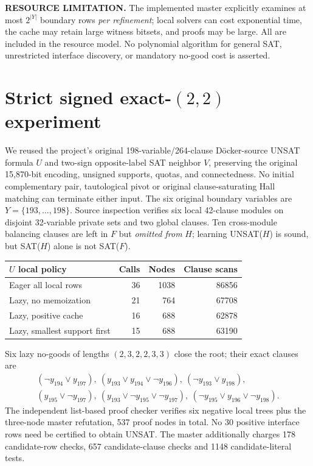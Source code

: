 \documentclass[11pt]{article}
\begin{document}
\noindent\textbf{RESOURCE LIMITATION.} The implemented master explicitly examines at most $2^{|Y|}$ boundary rows \emph{per refinement}; local solvers can cost exponential time, the cache may retain large witness bitsets, and proofs may be large. All are included in the resource model. No polynomial algorithm for general SAT, unrestricted interface discovery, or mandatory no-good cost is asserted.

\section{Strict signed exact-$(2,2)$ experiment}
We reused the project's original 198-variable/264-clause Döcker-source UNSAT formula $U$ and two-sign opposite-label SAT neighbor $V$, preserving the original 15,870-bit encoding, unsigned supports, quotas, and connectedness. No initial complementary pair, tautological pivot or original clause-saturating Hall matching can terminate either input. The six original boundary variables are $Y=\{193,\ldots,198\}$. Source inspection verifies six local 42-clause modules on disjoint 32-variable private sets and two global clauses. Ten cross-module balancing clauses are left in $F$ but \emph{omitted from} $H$; learning UNSAT($H$) is sound, but SAT($H$) alone is not SAT($F$).

\begin{center}
\begin{tabular}{lrrr}\toprule
$U$ local policy&Calls&Nodes&Clause scans\\\midrule
Eager all local rows&36&1038&86856\\
Lazy, no memoization&21&764&67708\\
Lazy, positive cache&16&688&62878\\
Lazy, smallest support first&15&688&63190\\\bottomrule
\end{tabular}
\end{center}
Six lazy no-goods of lengths $(2,3,2,2,3,3)$ close the root; their exact clauses are
\[
\begin{gathered}
(\neg y_{194}\lor y_{197}),~
(y_{193}\lor y_{194}\lor\neg y_{196}),~
(\neg y_{193}\lor y_{198}),\\
(y_{195}\lor\neg y_{197}),~
(y_{193}\lor\neg y_{195}\lor\neg y_{197}),~
(\neg y_{195}\lor y_{196}\lor\neg y_{198}).
\end{gathered}
\]
The independent list-based proof checker verifies six negative local trees plus the three-node master refutation, 537 proof nodes in total. No 30 positive interface rows need be certified to obtain UNSAT. The master additionally charges 178 candidate-row checks, 657 candidate-clause checks and 1148 candidate-literal tests.
\end{document}
